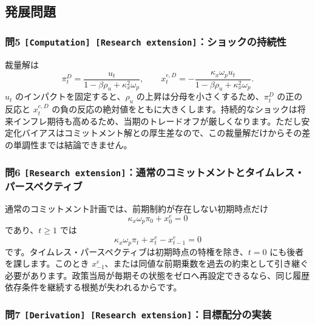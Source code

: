 \documentclass[
  japanese,
  lualatex,
  ja=standard,
  11pt,
  a4paper]{ltjsarticle}
\begin{document}
\subsection{発展問題}\label{ux767aux5c55ux554fux984c-8}

\subsubsection{\texorpdfstring{問5
\texttt{{[}Computation{]}\ {[}Research\ extension{]}}：ショックの持続性}{問5 {[}Computation{]} {[}Research extension{]}：ショックの持続性}}\label{ux554f5-computation-research-extensionux30b7ux30e7ux30c3ux30afux306eux6301ux7d9aux6027}

裁量解は \[
\pi_t^D
=\frac{u_t}{1-\beta\rho_u+\kappa_x^2\omega_p},
\qquad
x_t^{e,D}
=-\frac{\kappa_x\omega_p u_t}
{1-\beta\rho_u+\kappa_x^2\omega_p}.
\] \(u_t\) のインパクトを固定すると、\(\rho_u\)
の上昇は分母を小さくするため、\(\pi_t^D\) の正の反応と \(x_t^{e,D}\)
の負の反応の絶対値をともに大きくします。持続的なショックは将来インフレ期待も高めるため、当期のトレードオフが厳しくなります。ただし安定化バイアスはコミットメント解との厚生差なので、この裁量解だけからその差の単調性までは結論できません。

\subsubsection{\texorpdfstring{問6
\texttt{{[}Research\ extension{]}}：通常のコミットメントとタイムレス・パースペクティブ}{問6 {[}Research extension{]}：通常のコミットメントとタイムレス・パースペクティブ}}\label{ux554f6-research-extensionux901aux5e38ux306eux30b3ux30dfux30c3ux30c8ux30e1ux30f3ux30c8ux3068ux30bfux30a4ux30e0ux30ecux30b9ux30d1ux30fcux30b9ux30daux30afux30c6ux30a3ux30d6}

通常のコミットメント計画では、前期制約が存在しない初期時点だけ \[
\kappa_x\omega_p\pi_0+x_0^e=0
\] であり、\(t\geq1\) では \[
\kappa_x\omega_p\pi_t+x_t^e-x_{t-1}^e=0
\] です。タイムレス・パースペクティブは初期時点の特権を除き、\(t=0\)
にも後者を課します。このとき
\(x_{-1}^e\)、または同値な前期乗数を過去の約束として引き継ぐ必要があります。政策当局が毎期その状態をゼロへ再設定できるなら、同じ履歴依存条件を継続する根拠が失われるからです。

\subsubsection{\texorpdfstring{問7
\texttt{{[}Derivation{]}\ {[}Research\ extension{]}}：目標配分の実装}{問7 {[}Derivation{]} {[}Research extension{]}：目標配分の実装}}\label{ux554f7-derivation-research-extensionux76eeux6a19ux914dux5206ux306eux5b9fux88c5}
\end{document}

